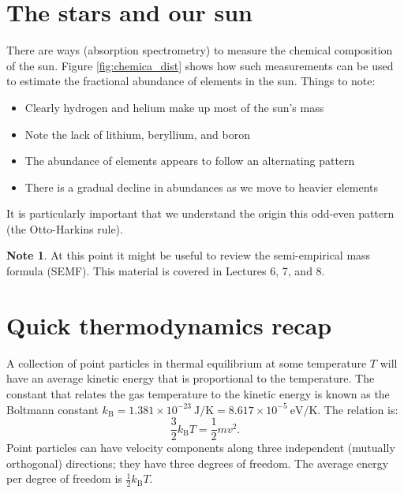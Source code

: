 \documentclass[a4paper,12pt]{article}
\theoremstyle{remark}
\newcommand{\mrm}[1]{\mathrm{#1}}
\renewcommand{\=}[1]{\stackrel{#1}{=}} %
\theoremstyle{plain}
\theoremstyle{definition}
\newtheorem*{definitionT}{Note}%
\newenvironment{note}{
\begin{dBox}
\begin{definitionT}}
{\end{definitionT}
\end{dBox}}
\begin{document}
\section{The stars and our sun}
There are ways (absorption spectrometry) to measure the chemical composition of the sun. Figure \ref{fig:chemica_dist} shows how such measurements can be used to estimate the fractional abundance of elements in the sun. Things to note:
\begin{itemize}
\item Clearly hydrogen and helium make up most of the sun's mass
\item Note the lack of lithium, beryllium, and boron
\item The abundance of elements appears to follow an alternating pattern
\item There is a gradual decline in abundances as we move to heavier elements
\end{itemize}
It is particularly important that we understand the origin this odd-even pattern (the Otto-Harkins rule). 

\begin{note}
At this point it might be useful to review the semi-empirical mass formula (SEMF). This material is covered in Lectures 6, 7, and 8.
\end{note}




\section{Quick thermodynamics recap}
A collection of point particles in thermal equilibrium at some temperature $T$ will have an average kinetic energy that is proportional to the temperature. The constant that relates the gas temperature to the kinetic energy is known as the Boltmann constant $k_\mrm{B} = 1.381 \times 10^{-23} \:\mrm{J/K} = 8.617 \times 10^{-5} \:\mrm{eV/K}$. The relation is:
\begin{equation}
\frac{3}{2} k_\mrm{B} T = \frac{1}{2} mv^{2}.
\end{equation}
Point particles can have velocity components along three independent (mutually orthogonal) directions; they have three degrees of freedom. The average energy per degree of freedom is $\frac{1}{2} k_\mrm{B}T$.
\end{document}
